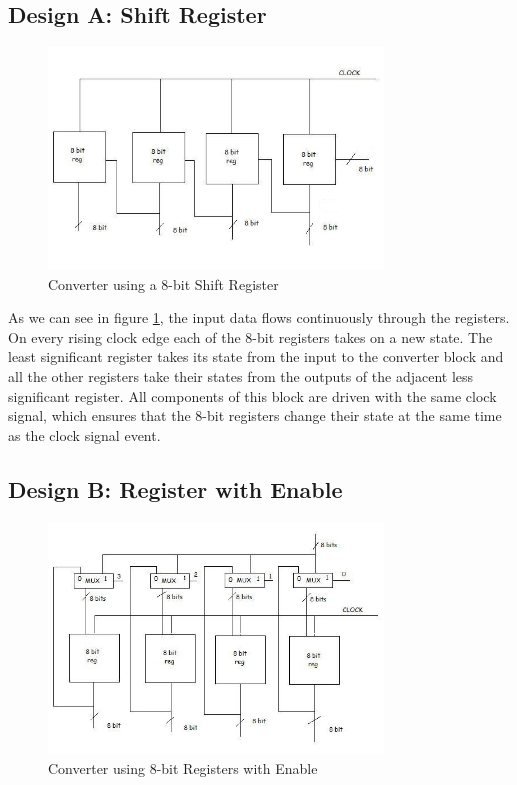 \documentclass[11pt,a4paper]{article}
\begin{document}
\subsection{Design A: Shift Register}

\begin{figure}[htp]
\centering
\includegraphics[width = 3.5in]{./images/shiftregister.jpg}
\caption{Converter using a 8-bit Shift Register}
\label{figure:sr}
\end{figure}

As we can see in figure \ref{figure:sr}, the input data flows continuously through the registers. On every rising clock edge each of the 8-bit registers takes on a new state. The least significant register takes its state from the input to the converter block and all the other registers take their states from the outputs of the adjacent less significant register. All components of this block are driven with the same clock signal, which ensures that the 8-bit registers change their state at the same time as the clock signal event. 


\subsection{Design B: Register with Enable}

\begin{figure}[htp]
\centering
\includegraphics[width = 3.5in]{./images/shiftregisterenable.jpg}
\caption{Converter using 8-bit Registers with Enable}
\label{figure:sre}
\end{figure}
\end{document}
